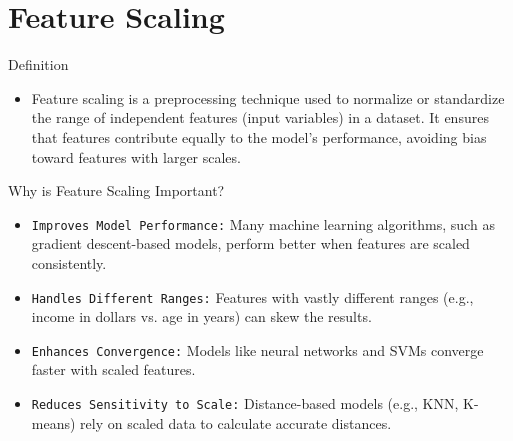 \documentclass[serif, aspectratio=169]{beamer}
\begin{document}
\section{Feature Scaling}

\begin{frame}{Definition}
    \begin{itemize}
        \item Feature scaling is a preprocessing technique used to normalize or standardize the range of independent features (input variables) in a dataset. It ensures that features contribute equally to the model's performance, avoiding bias toward features with larger scales.
    \end{itemize}
\end{frame}

\begin{frame}{Why is Feature Scaling Important?}
    \begin{itemize}
        \item \texttt{\color{teal}Improves Model Performance:} Many machine learning algorithms, such as gradient descent-based models, perform better when features are scaled consistently.

        \item \texttt{\color{teal}Handles Different Ranges:} Features with vastly different ranges (e.g., income in dollars vs. age in years) can skew the results.

        \item \texttt{\color{teal}Enhances Convergence:} Models like neural networks and SVMs converge faster with scaled features.

        \item \texttt{\color{teal}Reduces Sensitivity to Scale:} Distance-based models (e.g., KNN, K-means) rely on scaled data to calculate accurate distances.
    \end{itemize}
\end{frame}
\end{document}
